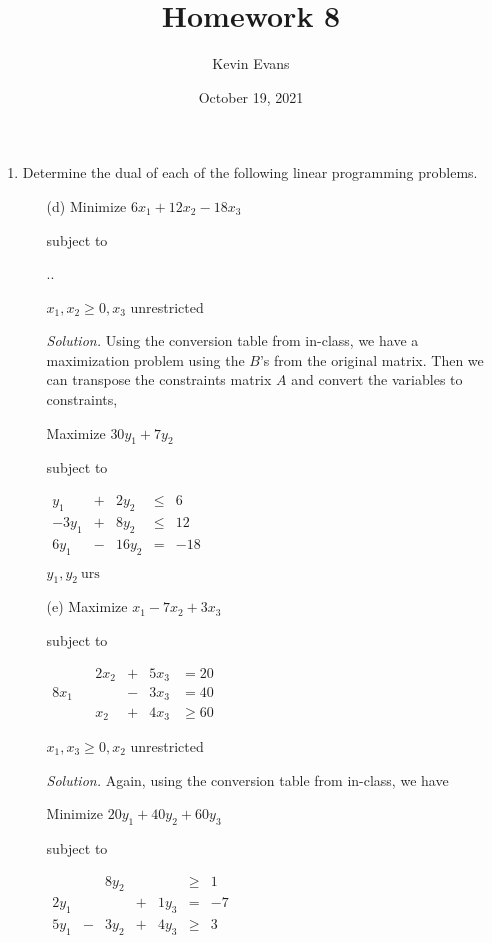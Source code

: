 \documentclass{homework}
\title{Homework 8}
\author{Kevin Evans}
\date{October 19, 2021}
\newcommand{\solution}{	\vspace{1em} \textit{Solution.} \quad }
\newcommand{\bolditem}[1][YYY]{\item[\textbf{#1}]}
\begin{document}
	\maketitle
	\begin{enumerate}
		\bolditem[4.2.1] Determine the dual of each of the following linear programming problems.
		\begin{enumerate}
			\item[(d)] Minimize $6x_1 + 12x_2 - 18x_3$
			
				subject to
				
				\sysdelim..
			
				$x_1, x_2 \ge 0, x_3$ unrestricted
				
				\solution Using the conversion table from in-class, we have a maximization problem using the $B$'s from the original matrix. Then we can transpose the constraints matrix $A$ and convert the variables to constraints,
				
				Maximize $30 y_1 + 7 y_2$
				
				subject to
				
				$
				\begin{array}{rrrrr}
					y_1 & + & 2 y_2 & \le & 6 \\
					-3y_1 & + & 8 y_2 & \le& 12 \\
					6 y_1 & - & 16 y_2 & = &-18
				\end{array}
				$
				
				$y_1, y_2 \: \mathrm{urs}$
				
			\item[(e)] Maximize $x_1 - 7x_2 + 3 x_3$ 
			
				subject to 
				
				$\begin{array}{rrrrrr}
					& & 2 x_2 & + & 5x_3 & = 20 \\
					8x_1 & & & - & 3x_3 & = 40 \\
					& & x_2 & + & 4 x_3 & \ge 60 
				\end{array}$
				
				$x_1, x_3 \ge 0, x_2$ unrestricted
				
				\solution Again, using the conversion table from in-class, we have 
				
				Minimize $20y_1 + 40 y_2 + 60 y_3$
				
				subject to
				
				$\begin{array}{rrrrrrr}
					 &  & 8 y_2 &  & & \ge & 1 \\
					2 y_1 &  &  & + & 1 y_3 & = & -7 \\
					5 y_1 & - & 3 y_2 & + & 4 y_3 & \ge & 3
				\end{array}$
			

\end{enumerate}
\end{enumerate}
\end{document}
